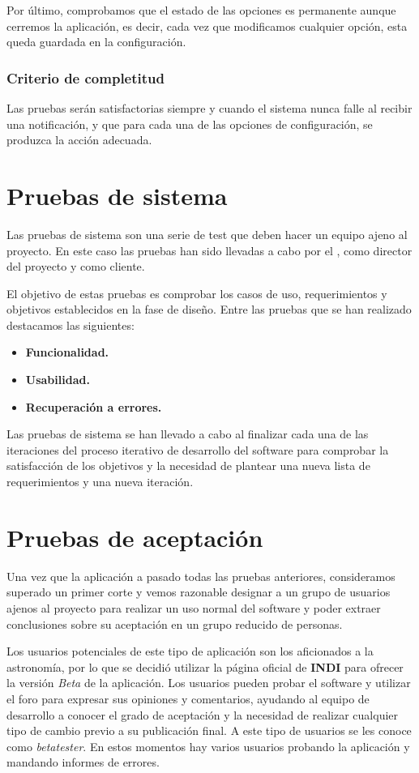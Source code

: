 \bigskip
Por último, comprobamos que el estado de las opciones es permanente aunque cerremos la aplicación, es decir, cada vez que modificamos cualquier opción, esta queda guardada en la configuración.

\subsubsection{Criterio de completitud}

Las pruebas serán satisfactorias siempre y cuando el sistema nunca falle al recibir una notificación, y que para cada una de las opciones de configuración, se produzca la acción adecuada.


\newpage
\section{Pruebas de sistema}

Las pruebas de sistema son una serie de test que deben hacer un equipo ajeno al proyecto. En este caso las pruebas han sido llevadas a cabo por el \tutor, como director del proyecto y como cliente.

\bigskip
El objetivo de estas pruebas es comprobar los casos de uso, requerimientos y objetivos establecidos en la fase de diseño. Entre las pruebas que se han realizado destacamos las siguientes:


\begin{itemize}
  \item \textbf{Funcionalidad.}
  \item \textbf{Usabilidad.}
  \item \textbf{Recuperación a errores.}
\end{itemize}

\bigskip
Las pruebas de sistema se han llevado a cabo al finalizar cada una de las iteraciones del proceso iterativo de desarrollo del software para comprobar la satisfacción de los objetivos y la necesidad de plantear una nueva lista de requerimientos y una nueva iteración.

\section{Pruebas de aceptación}

Una vez que la aplicación a pasado todas las pruebas anteriores, consideramos superado un primer corte y vemos razonable designar a un grupo de usuarios ajenos al proyecto para realizar un uso normal del software y poder extraer conclusiones sobre su aceptación en un grupo reducido de personas.

\bigskip
Los usuarios potenciales de este tipo de aplicación son los aficionados a la astronomía, por lo que se decidió utilizar la página oficial de \textbf{INDI} para ofrecer la versión \textit{Beta} de la aplicación. Los usuarios pueden probar el software y utilizar el foro para expresar sus opiniones y comentarios, ayudando al equipo de desarrollo a conocer el grado de aceptación y la necesidad de realizar cualquier tipo de cambio previo a su publicación final. A este tipo de usuarios se les conoce como \textit{betatester}. En estos momentos hay varios usuarios probando la aplicación y mandando informes de errores.
